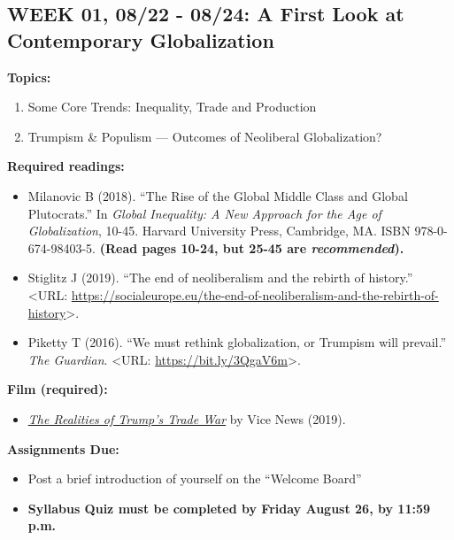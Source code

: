 \documentclass[11pt,]{article}
\providecommand{\tightlist}{%
  \setlength{\itemsep}{0pt}\setlength{\parskip}{0pt}}
\begin{document}
\hypertarget{week-01-0822---0824-a-first-look-at-contemporary-globalization}{%
\subsection{WEEK 01, 08/22 - 08/24: A First Look at Contemporary
Globalization}\label{week-01-0822---0824-a-first-look-at-contemporary-globalization}}

\textbf{Topics:}

\begin{enumerate}
\def\labelenumi{(\arabic{enumi})}
\tightlist
\item
  Some Core Trends: Inequality, Trade and Production
\item
  Trumpism \& Populism --- Outcomes of Neoliberal Globalization?
\end{enumerate}

\textbf{Required readings:}

\begin{itemize}
\item
  Milanovic B (2018). ``The Rise of the Global Middle Class and Global
  Plutocrats.'' In \emph{Global Inequality: A New Approach for the Age
  of Globalization}, 10-45. Harvard University Press, Cambridge, MA.
  ISBN 978-0-674-98403-5. \textbf{(Read pages 10-24, but 25-45 are
  \emph{recommended}).}
\item
  Stiglitz J (2019). ``The end of neoliberalism and the rebirth of
  history.'' \textless URL:
  \url{https://socialeurope.eu/the-end-of-neoliberalism-and-the-rebirth-of-history}\textgreater.
\item
  Piketty T (2016). ``We must rethink globalization, or Trumpism will
  prevail.'' \emph{The Guardian}. \textless URL:
  \url{https://bit.ly/3QgaV6m}\textgreater.
\end{itemize}

\textbf{Film (required):}

\begin{itemize}
\tightlist
\item
  \href{https://www.youtube.com/watch?v=9wjjQ55S4Nc}{\emph{The Realities
  of Trump's Trade War}} by Vice News (2019).
\end{itemize}

\textbf{Assignments Due:}

\begin{itemize}
\tightlist
\item
  Post a brief introduction of yourself on the ``Welcome Board''
\item
  \textbf{Syllabus Quiz must be completed by Friday August 26, by 11:59
  p.m.}
\end{itemize}
\end{document}
